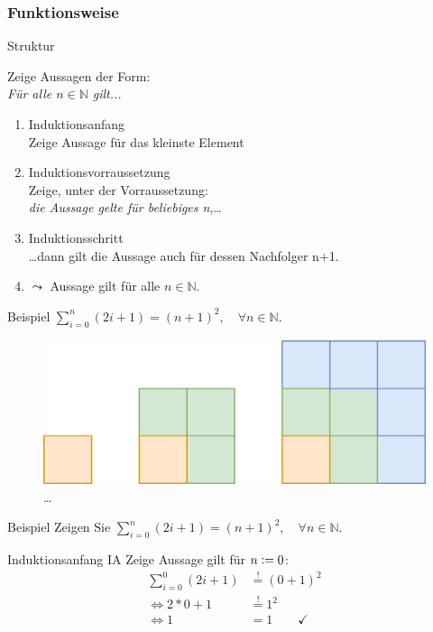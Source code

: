 \subsubsection{Funktionsweise}
\begin{frame}[fragile]{Struktur}
    \begin{alertblock}{Zeige Aussagen der Form:\\\emph{Für alle $n\in\mathbb{N}$ gilt...}}
    \begin{enumerate}
        \item \alert{Induktionsanfang}\\Zeige Aussage für das kleinste Element
        \item \alert{Induktionsvorraussetzung}\\Zeige, unter der Vorraussetzung: \\\emph{die Aussage gelte für beliebiges n},\dots
        \item \alert{Induktionsschritt}\\\dots dann gilt die Aussage auch für dessen Nachfolger n+1.
        \item $\leadsto$ Aussage gilt für alle $n \in \mathbb{N}$.
    \end{enumerate}
    \end{alertblock}
\end{frame}

\begin{frame}[fragile]{Beispiel}
\center $\displaystyle\sum_{i = 0}^{n} (2i+1) = (n+1)^2,\quad\forall n \in\mathbb{N}$.
    \begin{figure}
        \centering
        \includegraphics[width=0.5\textheight]{figures/Summe.png}\qquad \dots
    \end{figure}
\end{frame}

\begin{frame}[fragile]{Beispiel}
Zeigen Sie $\displaystyle\sum_{i = 0}^{n} (2i+1) = (n+1)^2,\quad\forall n \in\mathbb{N}$.
\begin{alertblock}{Induktionsanfang IA}
    Zeige Aussage gilt für $n\vcentcolon=0$:\\
    \begin{align*}
        \sum_{i = 0}^{0} (2i+1) &\overset{!}{=} (0+1)^2\\
        \iff 2 * 0 + 1 &\overset{!}{=}1^2\\
        \iff 1 &= 1 \qquad\checkmark
    \end{align*}
\end{alertblock}
\end{frame}

